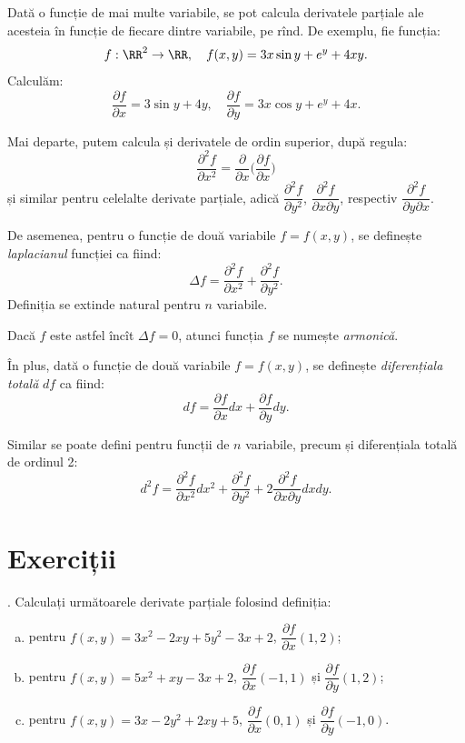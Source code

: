 Dată o funcție de mai multe variabile, se pot calcula derivatele parțiale ale
acesteia în funcție de fiecare dintre variabile, pe rînd. De exemplu,
fie funcția:
\[
  f : \RR^2 \to \RR, \quad f(x, y) = 3x \sin y + e^y + 4xy.
\]
Calculăm:
\[
  \frac{\partial f}{\partial x} = 3 \sin y + 4y, \quad %
  \frac{\partial f}{\partial y} = 3x\cos y + e^y + 4x.
\]

Mai departe, putem calcula și derivatele de ordin superior, după
regula:
\[
  \frac{\partial^2 f}{\partial x^2} = \frac{\partial}{\partial x} %
  \Big( \frac{\partial f}{\partial x} \Big)
\]
și similar pentru celelalte derivate parțiale, adică $ \dfrac{\partial^2 f}{\partial y^2} $,
$ \dfrac{\partial^2 f}{\partial x \partial y} $, respectiv
$ \dfrac{\partial^2 f}{\partial y \partial x} $.

De asemenea, pentru o funcție de două variabile $ f = f(x, y) $, se definește
\emph{laplacianul} funcției ca fiind:
\[
  \Delta f = \frac{\partial^2 f}{\partial x^2} + \frac{\partial^2 f}{\partial y^2}.
\]
Definiția se extinde natural pentru $ n $ variabile.

Dacă $ f $ este astfel încît $ \Delta f = 0 $, atunci funcția $ f $
se numește \emph{armonică}.  

În plus, dată o funcție de două variabile $ f = f(x, y) $, se definește
\emph{diferențiala totală} $ df $ ca fiind:
\[
  df = \frac{\partial f}{\partial x} dx + \frac{\partial f}{\partial y} dy.
\]

Similar se poate defini pentru funcții de $ n $ variabile, precum și
diferențiala totală de ordinul 2:
\[
  d^2 f = \frac{\partial^2 f}{\partial x^2} dx^2 + \frac{\partial^2 f}{\partial y^2} + %
  2 \frac{\partial^2 f}{\partial x \partial y} dxdy.
\]


\section{Exerciții}

\indent {}. Calculați următoarele derivate parțiale folosind definiția:
\begin{enumerate}[(a)]
\item pentru $ f(x, y) = 3x^2 - 2xy + 5y^2 - 3x + 2 $, $ \dfrac{\partial f}{\partial x}(1, 2) $;
\item pentru $ f(x, y) = 5x^2 + xy - 3x + 2 $, $ \dfrac{\partial f}{\partial x}(-1, 1) $ și
  $ \dfrac{\partial f}{\partial y}(1, 2) $;
\item pentru $ f(x, y) = 3x - 2y^2 + 2xy + 5 $, $ \dfrac{\partial f}{\partial x}(0, 1) $ și
  $ \dfrac{\partial f}{\partial y}(-1, 0) $.
\end{enumerate}

